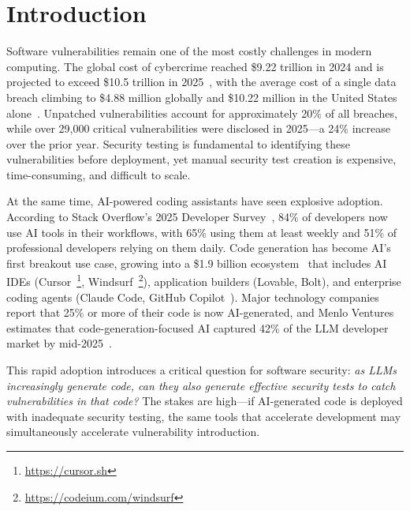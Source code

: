 \documentclass[sigconf,anonymous,review]{acmart}
\begin{document}

\maketitle

\section{Introduction}

Software vulnerabilities remain one of the most costly challenges in modern computing. The global cost of cybercrime reached \$9.22 trillion in 2024 and is projected to exceed \$10.5 trillion in 2025~\cite{cybersecventures2025}, with the average cost of a single data breach climbing to \$4.88 million globally and \$10.22 million in the United States alone~\cite{ibm2024breach}. Unpatched vulnerabilities account for approximately 20\% of all breaches, while over 29,000 critical vulnerabilities were disclosed in 2025---a 24\% increase over the prior year. Security testing is fundamental to identifying these vulnerabilities before deployment, yet manual security test creation is expensive, time-consuming, and difficult to scale.

At the same time, AI-powered coding assistants have seen explosive adoption. According to Stack Overflow's 2025 Developer Survey~\cite{stackoverflow2025survey}, 84\% of developers now use AI tools in their workflows, with 65\% using them at least weekly and 51\% of professional developers relying on them daily. Code generation has become AI's first breakout use case, growing into a \$1.9 billion ecosystem~\cite{menlo2025llm} that includes AI IDEs (Cursor~\footnote{\url{https://cursor.sh}}, Windsurf~\footnote{\url{https://codeium.com/windsurf}}), application builders (Lovable, Bolt), and enterprise coding agents (Claude Code, GitHub Copilot~\cite{pearce2022asleep}). Major technology companies report that 25\% or more of their code is now AI-generated, and Menlo Ventures estimates that code-generation-focused AI captured 42\% of the LLM developer market by mid-2025~\cite{menlo2025llm}.

This rapid adoption introduces a critical question for software security: \emph{as LLMs increasingly generate code, can they also generate effective security tests to catch vulnerabilities in that code?} The stakes are high---if AI-generated code is deployed with inadequate security testing, the same tools that accelerate development may simultaneously accelerate vulnerability introduction.
\end{document}
